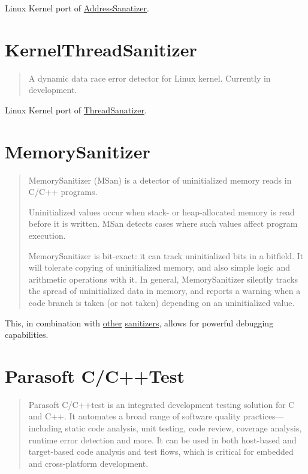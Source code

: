 \documentclass[12pt]{article}
\begin{document}
\label{kasan}
Linux Kernel port of \hyperref[asan]{AddressSanatizer}.
\cite{kasan}
\section{KernelThreadSanitizer}

\begin{quote}
A dynamic data race error detector for Linux kernel. Currently in development.
\end{quote}

\label{ktsan}
Linux Kernel port of \hyperref[tsan]{ThreadSanatizer}.
\cite{ktsan}
\section{MemorySanitizer}

\begin{quote}
MemorySanitizer (MSan) is a detector of uninitialized memory reads
in C/C++ programs.

Uninitialized values occur when stack- or heap-allocated memory
is read before it is written. MSan detects cases where such values
affect program execution.

MemorySanitizer is bit-exact: it can track uninitialized bits in
a bitfield. It will tolerate copying of uninitialized memory, and
also simple logic and arithmetic operations with it. In general,
MemorySanitizer silently tracks the spread of uninitialized data in
memory, and reports a warning when a code branch is taken (or not
taken) depending on an uninitialized value.
\end{quote}

\label{msan}
This, in combination with \hyperref[asan]{other} \hyperref[tsan]{sanitizers},
allows for powerful debugging capabilities.
\cite{msan}
\section{Parasoft C/C++Test}

\begin{quote}
Parasoft C/C++test is an integrated development testing solution for C and
C++. It automates a broad range of software quality practices—including
static code analysis, unit testing, code review, coverage analysis,
runtime error detection and more. It can be used in both host-based
and target-based code analysis and test flows, which is critical for
embedded and cross-platform development.
\end{quote}
\end{document}
